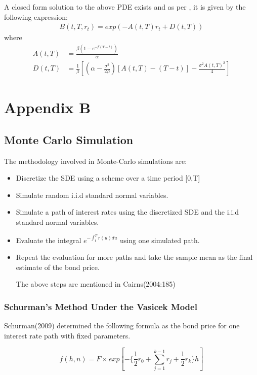 \documentclass[12pt,a4paper]{article}
\begin{document}
A closed form solution to the above PDE exists and as per \cite{mamon2004three}, it is given by the following expression:
\begin{gather*}
\boxed{B(t,T,r_t) =exp(-A(t,T)r_t+D(t,T))}
\end{gather*}
where
\begin{align*}
A(t,T)&=\frac{\beta(1-e^{-\beta(T-t)})}{\alpha}\\
D(t,T)&=\frac{1}{\beta}\left[\left(\alpha-\frac{\sigma^2}{2\beta}\right)[A(t,T)-(T-t)]-\frac{\sigma^2A(t,T)^2}{4}\right]
\end{align*}

\newpage
\section{Appendix B}
\label{sec: Appendix B}
\subsection{Monte Carlo Simulation}
\label{subsec: MC}
The methodology involved in Monte-Carlo simulations are:

\begin{itemize}
	\item Discretize the SDE using a scheme over a time period [0,T]
	\item Simulate random i.i.d standard normal variables.
	\item Simulate a path of interest rates using the discretized SDE and the i.i.d standard normal variables.
	\item Evaluate the integral $e^{-\int_{t}^{T} r(u)du}$ using one simulated path.
	\item Repeat the evaluation for more paths and take the sample mean as the final estimate of the bond price.
	
	The above steps are mentioned in Cairns(2004:185)
\end{itemize}



\subsubsection{Schurman's Method Under the Vasicek Model}
\label{subsubsec: Schurman}

Schurman(2009) determined the following formula as the bond price for one interest rate path with fixed parameters.  

$$f(h,n)=F\times exp[-\{\frac{1}{2}r_{0}+\sum_{j=1}^{k-1}r_{j} +\frac{1}{2}r_{k}\}h]$$
\end{document}
